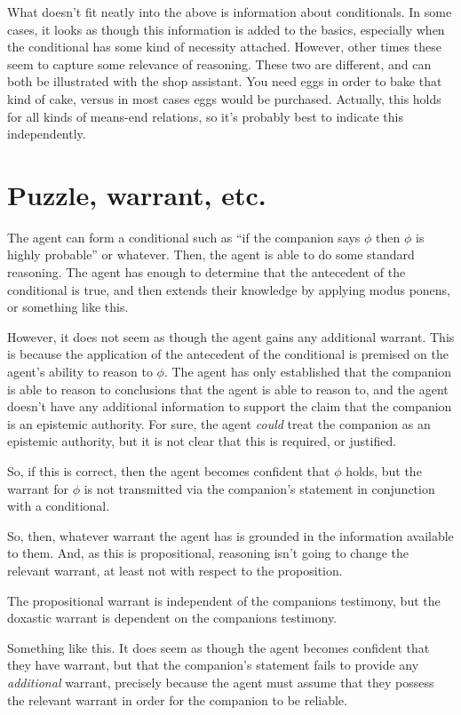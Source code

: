 \documentclass[10pt]{article}
\begin{document}
What doesn't fit neatly into the above is information about conditionals.
In some cases, it looks as though this information is added to the basics, especially when the conditional has some kind of necessity attached.
However, other times these seem to capture some relevance of reasoning.
These two are different, and can both be illustrated with the shop assistant.
You need eggs in order to bake that kind of cake, versus in most cases eggs would be purchased.
Actually, this holds for all kinds of means-end relations, so it's probably best to indicate this independently.

\section{Puzzle, warrant, etc.}
\label{sec:puzzle-warrant-etc}

The agent can form a conditional such as ``if the companion says \(\phi\) then \(\phi\) is highly probable'' or whatever.
Then, the agent is able to do some standard reasoning.
The agent has enough to determine that the antecedent of the conditional is true, and then extends their knowledge by applying modus ponens, or something like this.

However, it does not seem as though the agent gains any additional warrant.
This is because the application of the antecedent of the conditional is premised on the agent's ability to reason to \(\phi\).
The agent has only established that the companion is able to reason to conclusions that the agent is able to reason to, and the agent doesn't have any additional information to support the claim that the companion is an epistemic authority.
For sure, the agent \emph{could} treat the companion as an epistemic authority, but it is not clear that this is required, or justified.

So, if this is correct, then the agent becomes confident that \(\phi\) holds, but the warrant for \(\phi\) is not transmitted via the companion's statement in conjunction with a conditional.

So, then, whatever warrant the agent has is grounded in the information available to them.
And, as this is propositional, reasoning isn't going to change the relevant warrant, at least not with respect to the proposition.

The propositional warrant is independent of the companions testimony, but the doxastic warrant is dependent on the companions testimony.

Something like this.
It does seem as though the agent becomes confident that they have warrant, but that the companion's statement fails to provide any \emph{additional} warrant, precisely because the agent must assume that they possess the relevant warrant in order for the companion to be reliable.
\end{document}
